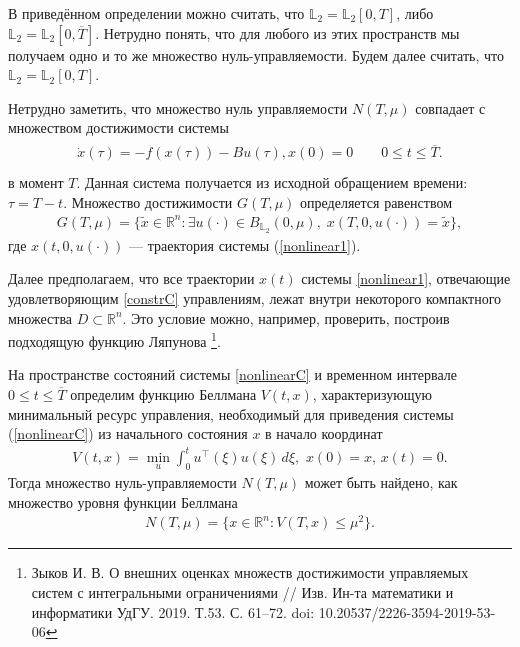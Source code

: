 \documentclass[../main.tex]{subfiles}
\begin{document}
	В приведённом определении можно считать, что $ \mathbb{L}_2 =\mathbb{L}_2[0,T] $, либо  $ \mathbb{L}_2 =\mathbb{L}_2[0,\overline{T}] $. Нетрудно понять, что для любого из этих пространств мы получаем одно и то же множество нуль-управляемости. Будем далее считать, что $ \mathbb{L}_2 =\mathbb{L}_2[0,T] $.
	
	Нетрудно заметить, что множество нуль управляемости $N(T,\mu)$ 
	совпадает с множеством достижимости системы 
	\begin{gather}\label{nonlinear1}
		\begin{gathered}
			\dot{x}(\tau)=-f(x(\tau))-B u(\tau), x(0)=0 \qquad 0 \leqslant t \leqslant   \overline{T}. \\
		\end{gathered}
	\end{gather}
	в момент $T$. Данная система получается из исходной обращением времени: $\tau=T-t$.  Множество достижимости $G(T,\mu)$ определяется равенством 
	\begin{gather*}
			G(T,\mu)=\{\widetilde{x}\in \mathbb{R}^n:\exists u(\cdot)\in B_{\mathbb{L}_2}(0,\mu),\; x( T,0,u(\cdot)) = \widetilde{x}\},
			\end{gather*}
	где  $x( t,0,u(\cdot))$	--- траектория системы (\ref{nonlinear1}).	
			
	Далее предполагаем, что все траектории $ x(t) $ системы \eqref{nonlinear1}, отвечающие удовлетворяющим \eqref{constrC} управлениям,  лежат внутри некоторого компактного множества $ D \subset \mathbb{R}^n $. Это условие можно, например, проверить, построив подходящую функцию Ляпунова \footnote{Зыков И. В. О внешних оценках множеств достижимости управляемых систем с интегральными ограничениями  // Изв. Ин-та математики и информатики УдГУ. 2019. Т.53. С. 61–72.  doi: 10.20537/2226-3594-2019-53-06}.
	
	
	На пространстве состояний системы \eqref{nonlinearC} и временном интервале $ 0 \leqslant t \leqslant \overline{T} $ определим функцию Беллмана $ V(t,x) $, характеризующую минимальный ресурс управления, необходимый для приведения системы (\ref{nonlinearC}) из начального состояния $x$ в начало координат
	\begin{gather}\label{bellm}
		V(t,x) = \min\limits_{u} \int_{0}^{t} u^{\top}(\xi) u(\xi) \,d\xi, \, \,x(0)=x,\,x(t)=0.
	\end{gather}
	Тогда множество нуль-управляемости $ N(T,\mu) $ может быть найдено, как множество уровня функции Беллмана
	\begin{gather*}
		N(T,\mu)  = \{x \in \mathbb{R}^n: V(T,x) \leqslant \mu^2\}.
	\end{gather*}
	
\end{document}

